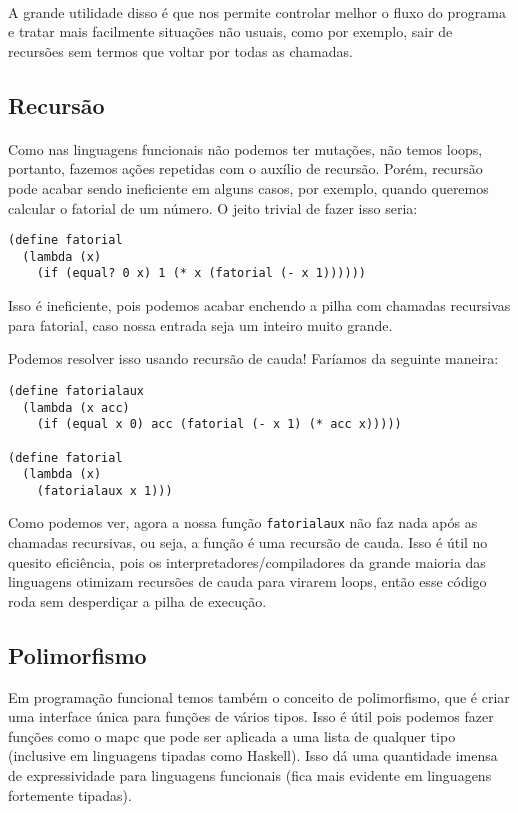 \documentclass[11pt]{article}
\begin{document}
\paragraph{} A grande utilidade disso é que nos permite controlar melhor o fluxo do programa e tratar mais facilmente situações não usuais, como por
exemplo, sair de recursões sem termos que voltar por todas as chamadas.

\color{red}

\subsection{Recursão}
\label{sec:orgce3d05e}
\paragraph{} Como nas linguagens funcionais não podemos ter mutações, não temos loops, portanto, fazemos ações repetidas com o auxílio de
recursão. Porém, recursão pode acabar sendo ineficiente em alguns casos, por exemplo, quando queremos calcular o fatorial de um número. O
jeito trivial de fazer isso seria:

\begin{verbatim}
(define fatorial
  (lambda (x)
    (if (equal? 0 x) 1 (* x (fatorial (- x 1))))))
\end{verbatim}

Isso é ineficiente, pois podemos acabar enchendo a pilha com chamadas recursivas para fatorial, caso nossa entrada seja um inteiro muito
grande.

Podemos resolver isso usando recursão de cauda! Faríamos da seguinte maneira:

\begin{verbatim}
(define fatorialaux
  (lambda (x acc)
    (if (equal x 0) acc (fatorial (- x 1) (* acc x)))))

(define fatorial
  (lambda (x)
    (fatorialaux x 1)))
\end{verbatim}

Como podemos ver, agora a nossa função \texttt{fatorialaux} não faz nada após as chamadas recursivas, ou seja, a função é uma recursão de cauda.
Isso é útil no quesito eficiência, pois os interpretadores/compiladores da grande maioria das linguagens otimizam recursões de cauda para
virarem loops, então esse código roda sem desperdiçar a pilha de execução.

\subsection{Polimorfismo}
\label{sec:orgd0824eb}
Em programação funcional temos também o conceito de polimorfismo, que é criar uma interface única para funções de vários tipos. Isso é
útil pois podemos fazer funções como o mapc que pode ser aplicada a uma lista de qualquer tipo (inclusive em linguagens tipadas como
Haskell). Isso dá uma quantidade imensa de expressividade para linguagens funcionais (fica mais evidente em linguagens fortemente
tipadas).
\end{document}
